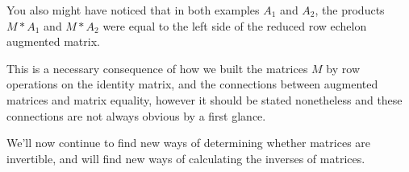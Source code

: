 \documentclass{ximera}
\begin{document}
\begin{remark}
  You also might have noticed that in both examples $A_1$ and $A_2$, the products $M*A_1$ and $M*A_2$ were equal to the left side of the reduced row echelon augmented matrix. 

  This is a necessary consequence of how we built the matrices $M$ by row operations on the identity matrix, and the connections between augmented matrices and matrix equality, however it should be stated nonetheless and these connections are not always obvious by a first glance.
\end{remark}

We'll now continue to find new ways of determining whether matrices are invertible, and will find new ways of calculating the inverses of matrices.
\end{document}
